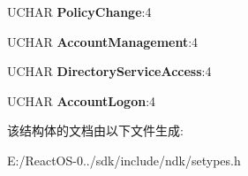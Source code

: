 \begin{DoxyCompactItemize}
U\+C\+H\+AR {\bfseries Policy\+Change}\+:4
\item 
\mbox{\label{struct___s_e_p___a_u_d_i_t___p_o_l_i_c_y___c_a_t_e_g_o_r_i_e_s_aa8b9381ca5b8afc5a43372d723fd2454}} 
U\+C\+H\+AR {\bfseries Account\+Management}\+:4
\item 
\mbox{\label{struct___s_e_p___a_u_d_i_t___p_o_l_i_c_y___c_a_t_e_g_o_r_i_e_s_aa3b30dab1cc6fbe85dba0ec1a448472b}} 
U\+C\+H\+AR {\bfseries Directory\+Service\+Access}\+:4
\item 
\mbox{\label{struct___s_e_p___a_u_d_i_t___p_o_l_i_c_y___c_a_t_e_g_o_r_i_e_s_a642457c1e32ee2a03853e7ab7f32de4a}} 
U\+C\+H\+AR {\bfseries Account\+Logon}\+:4
\end{DoxyCompactItemize}


该结构体的文档由以下文件生成\+:\begin{DoxyCompactItemize}
\item 
E\+:/\+React\+O\+S-\/0../sdk/include/ndk/setypes.\+h\end{DoxyCompactItemize}
